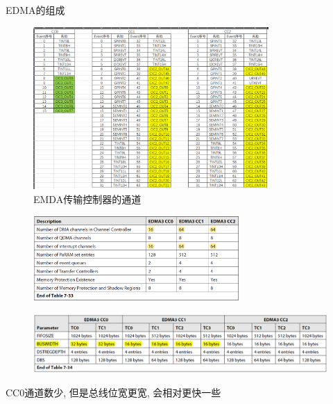 \documentclass[10pt]{ctexbeamer}
\begin{document}
    \begin{frame}[allowframebreaks]{EDMA的组成}
    \begin{figure}
        \centering
        \includegraphics[width=0.8\textwidth]{summary/7.eps}
        \caption{EMDA传输控制器的通道}
    \end{figure}
    \begin{figure}
        \centering
        \includegraphics[width=0.7\textwidth]{summary/8.eps}
    \end{figure}
    \begin{figure}
        \centering
        \includegraphics[width=\textwidth]{summary/9.eps}
    \end{figure}
    \begin{center}
        CC0通道数少, 但是总线位宽更宽, 会相对更快一些
    \end{center}
    \end{frame}
\end{document}
